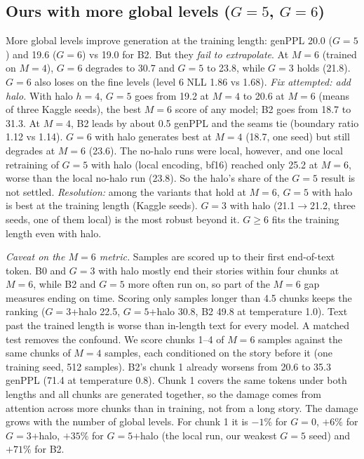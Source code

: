 \subsection{Ours with more global levels ($G{=}5$, $G{=}6$)}
More global levels improve generation at the training length: genPPL 20.0 ($G{=}5$) and 19.6 ($G{=}6$) vs 19.0
for B2. But they \emph{fail to extrapolate}. At $M{=}6$ (trained on $M{=}4$), $G{=}6$ degrades to 30.7 and
$G{=}5$ to 23.8, while $G{=}3$ holds (21.8). $G{=}6$ also loses on the fine levels (level 6 NLL 1.86 vs 1.68).
\emph{Fix attempted: add halo.} With halo $h{=}4$, $G{=}5$ goes from 19.2 at $M{=}4$ to 20.6 at $M{=}6$ (means of
three Kaggle seeds), the best $M{=}6$ score of any model; B2 goes from 18.7 to 31.3. At $M{=}4$, B2 leads by about
0.5 genPPL and the seams tie (boundary ratio 1.12 vs 1.14). $G{=}6$ with halo generates best at $M{=}4$ (18.7, one
seed) but still degrades at $M{=}6$ (23.6). The no-halo runs were local, however, and one local retraining of
$G{=}5$ with halo (local encoding, bf16) reached only 25.2 at $M{=}6$, worse than the local no-halo run (23.8).
So the halo's share of the $G{=}5$ result is not settled. \emph{Resolution:} among the variants that hold at
$M{=}6$, $G{=}5$ with halo is best at the training length (Kaggle seeds). $G{=}3$ with halo (21.1$\to$21.2, three
seeds, one of them local) is the most robust beyond it. $G\ge 6$ fits the training length even with halo.

\emph{Caveat on the $M{=}6$ metric.} Samples are scored up to their first end-of-text token. B0 and $G{=}3$ with
halo mostly end their stories within four chunks at $M{=}6$, while B2 and $G{=}5$ more often run on, so part of the
$M{=}6$ gap measures ending on time. Scoring only samples longer than 4.5 chunks keeps the ranking ($G{=}3$+halo
22.5, $G{=}5$+halo 30.8, B2 49.8 at temperature 1.0). Text past the trained length is worse than in-length text for
every model. A matched test removes the confound. We score chunks 1--4 of $M{=}6$ samples against the same chunks of
$M{=}4$ samples, each conditioned on the story before it (one training seed, 512 samples). B2's chunk 1 already
worsens from 20.6 to 35.3 genPPL (71.4 at temperature 0.8). Chunk 1 covers the same tokens under both lengths and
all chunks are generated together, so the damage comes from attention across more chunks than in training, not
from a long story. The damage grows with the number of global levels. For chunk 1 it is $-1\%$ for $G{=}0$, $+6\%$ for $G{=}3$+halo, $+35\%$ for $G{=}5$+halo (the local run, our weakest
$G{=}5$ seed) and $+71\%$ for B2.

